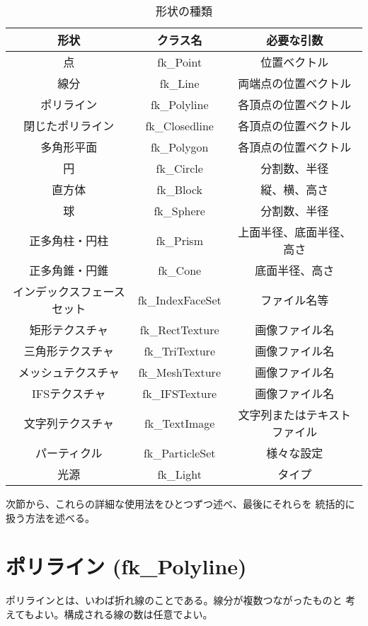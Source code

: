 \begin{table}[H]
\caption{形状の種類}
\label{tbl:fkShape1}
\begin{center}
\begin{small}
\begin{tabular}{|c|c|c|}
\hline
形状 & クラス名 & 必要な引数 \\ \hline \hline
点 & fk\_Point & 位置ベクトル \\ \hline
線分 & fk\_Line & 両端点の位置ベクトル \\ \hline
ポリライン & fk\_Polyline & 各頂点の位置ベクトル \\ \hline
閉じたポリライン & fk\_Closedline & 各頂点の位置ベクトル \\ \hline
多角形平面 & fk\_Polygon & 各頂点の位置ベクトル \\ \hline
円 & fk\_Circle & 分割数、半径 \\ \hline
直方体 & fk\_Block & 縦、横、高さ \\ \hline
球 & fk\_Sphere & 分割数、半径 \\ \hline
正多角柱・円柱 & fk\_Prism & 上面半径、底面半径、高さ \\ \hline
正多角錐・円錐 & fk\_Cone & 底面半径、高さ \\ \hline
インデックスフェースセット & fk\_IndexFaceSet & ファイル名等 \\ \hline
矩形テクスチャ & fk\_RectTexture & 画像ファイル名 \\ \hline
三角形テクスチャ & fk\_TriTexture & 画像ファイル名 \\ \hline
メッシュテクスチャ & fk\_MeshTexture & 画像ファイル名 \\ \hline
IFSテクスチャ & fk\_IFSTexture & 画像ファイル名 \\ \hline
文字列テクスチャ & fk\_TextImage & 文字列またはテキストファイル \\ \hline
パーティクル & fk\_ParticleSet & 様々な設定 \\ \hline
光源 & fk\_Light & タイプ \\ \hline
\end{tabular}
\end{small}
\end{center}
\end{table}
次節から、これらの詳細な使用法をひとつずつ述べ、最後にそれらを
統括的に扱う方法を述べる。

\section{ポリライン (fk\_Polyline)}
ポリラインとは、いわば折れ線のことである。線分が複数つながったものと
考えてもよい。構成される線の数は任意でよい。

